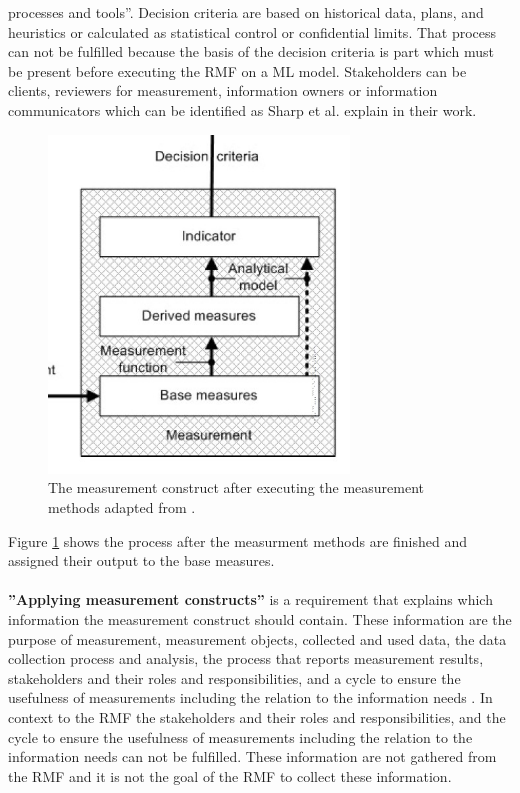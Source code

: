 processes and tools''. Decision criteria are based on historical data, plans, and heuristics or calculated as statistical control or confidential limits. That process can not be fulfilled because the basis of the decision criteria is part which must be present before executing the RMF on a ML model. Stakeholders can be clients, reviewers for measurement, information owners or information communicators \cite{ISO_27004_2009} which can be identified as Sharp et al. \cite{DBLP:conf/dexaw/SharpFG99} explain in their work.

\begin{figure}[ht!]
  \centering
  \includegraphics[width=8cm]{pictures/measurement.jpg}
  \caption{The measurement construct after executing the measurement methods adapted from \cite{ISO_27004_2009}.}
  \label{fig:measurement}
\end{figure}

Figure \ref{fig:measurement} shows the process after the measurment methods are finished and assigned their output to the base measures. \\ \\

\textbf{''Applying measurement constructs''} is a requirement that explains which information the measurement construct should contain. These information are the purpose of measurement, measurement objects, collected and used data, the data collection process and analysis, the process that reports measurement results, stakeholders and their roles and responsibilities, and a cycle to ensure the usefulness of measurements including the relation to the information needs \cite{ISO_27004_2009}. In context to the RMF the stakeholders and their roles and responsibilities, and the cycle to ensure the usefulness of measurements including the relation to the information needs can not be fulfilled. These information are not gathered from the RMF and it is not the goal of the RMF to collect these information. \\ \\

